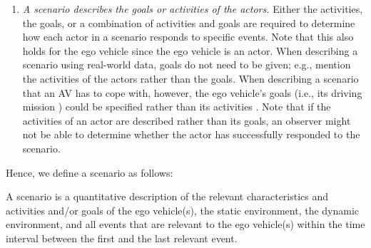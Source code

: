 \begin{enumerate}
	
	\item\textit{A scenario describes the goals or activities of the \cstartb actors.\cendb}
	\cstartb Either the activities, the goals, or a combination of activities and goals are required to determine \cendb\cstartd how each actor in a scenario responds to specific events. \cendd
	Note that this also holds for the ego vehicle since the ego vehicle is an actor.
	\cstarte When describing a scenario using real-world data, goals do not need to be given; e.g., \cende \textcite{elrofai2016scenario} mention the activities of the \cstartb actors \cendb rather than the goals. When describing a scenario that an AV has to cope with, however, the ego vehicle's goals (i.e., its driving mission \autocite{geyer2014}) could be specified rather than its activities \autocite{ulbrich2015}. Note that if the activities of \cstartb an actor \cendb are described rather than its goals, an observer might not be able to determine whether the \cstartb actor \cendb has successfully responded to the scenario.
\end{enumerate}


Hence, we define a scenario as follows:
\begin{definition}[Scenario]\label{def:scenario}
	\cstartd A scenario is a quantitative description of the relevant characteristics and activities and/or goals of the ego vehicle(s), the static environment, the dynamic environment, and all events that are relevant to the ego vehicle(s) within the time interval between the first and the last relevant event. \cendd
\end{definition}



